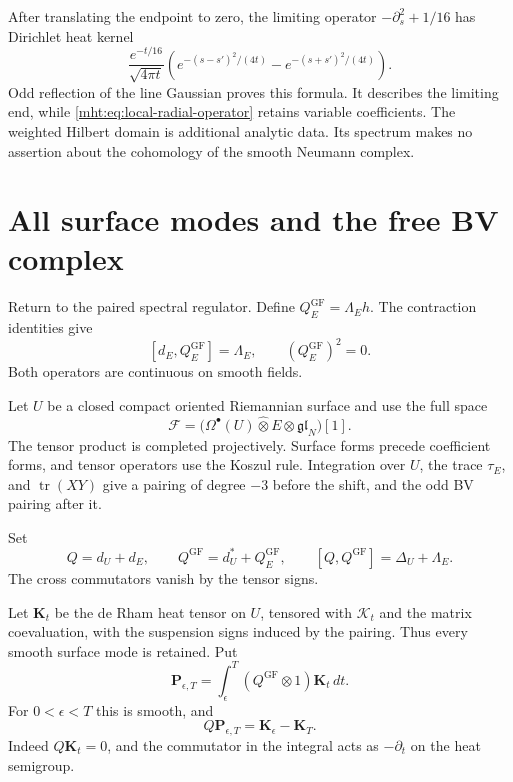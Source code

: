 After translating the endpoint to zero, the limiting operator
$-\partial_s^2+1/16$ has Dirichlet heat kernel
\[
 \frac{e^{-t/16}}{\sqrt{4\pi t}}
 \left(e^{-(s-s')^2/(4t)}-e^{-(s+s')^2/(4t)}\right).
\]
Odd reflection of the line Gaussian proves this formula.
It describes the limiting end, while
\eqref{mht:eq:local-radial-operator} retains variable coefficients.
The weighted Hilbert domain is additional analytic data. Its
spectrum makes no assertion about the cohomology of the smooth
Neumann complex.

\section{All surface modes and the free BV complex}

Return to the paired spectral regulator. Define
$Q_E^{\mathrm{GF}}=\Lambda_Eh$. The contraction identities give
\[
 [d_E,Q_E^{\mathrm{GF}}]=\Lambda_E,
 \qquad (Q_E^{\mathrm{GF}})^2=0.
\]
Both operators are continuous on smooth fields.

Let $U$ be a
closed compact oriented Riemannian surface and use the full space
\begin{equation}\label{mht:eq:heat-field-space}
 \mathcal F=
  \bigl(\Omega^\bullet(U)\widehat\otimes E
                   \otimes\mathfrak{gl}_N\bigr)[1].
\end{equation}
The tensor product is completed projectively. Surface forms
precede coefficient forms, and tensor operators use the Koszul
rule. Integration over $U$, the trace $\tau_E$, and
$\operatorname{tr}(XY)$ give a pairing of degree $-3$ before
the shift, and the odd BV pairing after it.

Set
\[
 Q=d_U+d_E,
 \qquad Q^{\mathrm{GF}}=d_U^*+Q_E^{\mathrm{GF}},
 \qquad [Q,Q^{\mathrm{GF}}]=\Delta_U+\Lambda_E.
\]
The cross commutators vanish by the tensor signs.

Let
$\mathbf K_t$ be the de Rham heat tensor on $U$, tensored
with $\mathcal K_t$ and the matrix coevaluation, with the
suspension signs induced by the pairing. Thus every smooth
surface mode is retained. Put
\begin{equation}\label{mht:eq:surface-heat-propagator}
 \mathbf P_{\epsilon,T}
   =\int_\epsilon^T(Q^{\mathrm{GF}}\otimes1)\mathbf K_t\,dt.
\end{equation}
For $0<\epsilon<T$ this is smooth, and
\begin{equation}\label{mht:eq:surface-heat-ward}
 Q\mathbf P_{\epsilon,T}=\mathbf K_\epsilon-\mathbf K_T.
\end{equation}
Indeed $Q\mathbf K_t=0$, and the commutator in the integral
acts as $-\partial_t$ on the heat semigroup.

